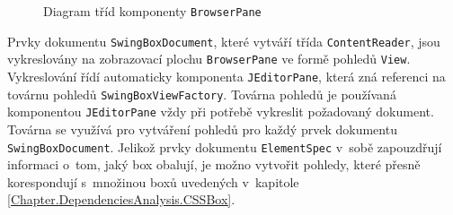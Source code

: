 \begin{figure}[H]
  \begin{center}
    \caption{Diagram tříd komponenty \texttt{BrowserPane}}
    \label{Figure.SwingBoxDesign}
  \end{center}
\end{figure}

\vspace{-1em}

Prvky dokumentu \texttt{SwingBoxDocument}, které vytváří třída \texttt{ContentReader}, jsou vykreslovány na zobrazovací plochu \texttt{BrowserPane} ve formě pohledů \texttt{View}. Vykreslování řídí automaticky komponenta \texttt{JEditorPane}, která zná referenci na továrnu pohledů \linebreak\texttt{SwingBoxViewFactory}. Továrna pohledů je používaná komponentou \texttt{JEditorPane} vždy při potřebě vykreslit požadovaný dokument. Továrna se využívá pro vytváření pohledů pro každý prvek dokumentu \texttt{SwingBoxDocument}. Jelikož prvky dokumentu \texttt{ElementSpec} v~sobě zapouzdřují informaci o~tom, jaký box obalují, je možno vytvořit pohledy, které přesně korespondují s~množinou boxů uvedených v~kapitole \ref{Chapter.DependenciesAnalysis.CSSBox}.

